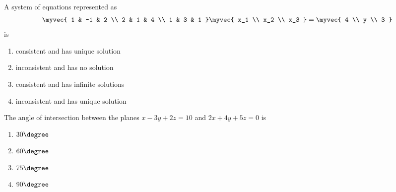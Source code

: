 \item A system of equations represented as
\begin{align*}
\myvec{
1 & -1 & 2 \\
2 & 1  & 4 \\
1 & 3  & 1
}
\myvec{
x_1 \\ x_2 \\ x_3
}
=
\myvec{
4 \\ y \\ 3
}
\end{align*}
is 
\hfill{}
    \begin{multicols}{2}
    \begin{enumerate}
    \item consistent and has unique solution
    \item inconsistent and has no solution
    \item consistent and has infinite solutions
    \item inconsistent and has unique solution 
    \end{enumerate}
    \end{multicols}
    \item The angle of intersection between the planes $x - 3y + 2z = 10$ and $2x + 4y + 5z = 0$ is
    \hfill{}
\begin{multicols}{4}
    \begin{enumerate}
    \item $30\degree$
    \item $60\degree$
    \item $75\degree$
    \item $90\degree$
    \end{enumerate}
    \end{multicols}

